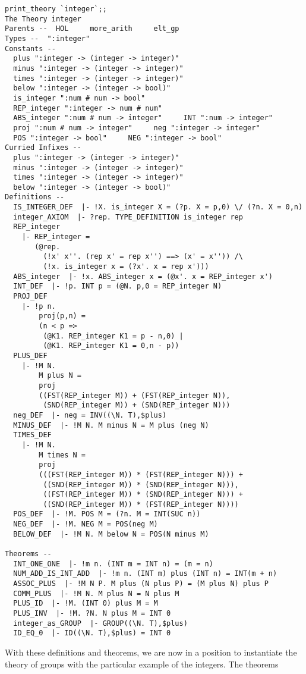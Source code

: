 \begin{verbatim}
print_theory `integer`;;
The Theory integer
Parents --  HOL     more_arith     elt_gp     
Types --  ":integer"     
Constants --
  plus ":integer -> (integer -> integer)"
  minus ":integer -> (integer -> integer)"
  times ":integer -> (integer -> integer)"
  below ":integer -> (integer -> bool)"
  is_integer ":num # num -> bool"
  REP_integer ":integer -> num # num"
  ABS_integer ":num # num -> integer"     INT ":num -> integer"
  proj ":num # num -> integer"     neg ":integer -> integer"
  POS ":integer -> bool"     NEG ":integer -> bool"     
Curried Infixes --
  plus ":integer -> (integer -> integer)"
  minus ":integer -> (integer -> integer)"
  times ":integer -> (integer -> integer)"
  below ":integer -> (integer -> bool)"     
Definitions --
  IS_INTEGER_DEF  |- !X. is_integer X = (?p. X = p,0) \/ (?n. X = 0,n)
  integer_AXIOM  |- ?rep. TYPE_DEFINITION is_integer rep
  REP_integer
    |- REP_integer =
       (@rep.
         (!x' x''. (rep x' = rep x'') ==> (x' = x'')) /\
         (!x. is_integer x = (?x'. x = rep x')))
  ABS_integer  |- !x. ABS_integer x = (@x'. x = REP_integer x')
  INT_DEF  |- !p. INT p = (@N. p,0 = REP_integer N)
  PROJ_DEF
    |- !p n.
        proj(p,n) =
        (n < p => 
         (@K1. REP_integer K1 = p - n,0) | 
         (@K1. REP_integer K1 = 0,n - p))
  PLUS_DEF
    |- !M N.
        M plus N =
        proj
        ((FST(REP_integer M)) + (FST(REP_integer N)),
         (SND(REP_integer M)) + (SND(REP_integer N)))
  neg_DEF  |- neg = INV((\N. T),$plus)
  MINUS_DEF  |- !M N. M minus N = M plus (neg N)
  TIMES_DEF
    |- !M N.
        M times N =
        proj
        (((FST(REP_integer M)) * (FST(REP_integer N))) +
         ((SND(REP_integer M)) * (SND(REP_integer N))),
         ((FST(REP_integer M)) * (SND(REP_integer N))) +
         ((SND(REP_integer M)) * (FST(REP_integer N))))
  POS_DEF  |- !M. POS M = (?n. M = INT(SUC n))
  NEG_DEF  |- !M. NEG M = POS(neg M)
  BELOW_DEF  |- !M N. M below N = POS(N minus M)

Theorems --
  INT_ONE_ONE  |- !m n. (INT m = INT n) = (m = n)
  NUM_ADD_IS_INT_ADD  |- !m n. (INT m) plus (INT n) = INT(m + n)
  ASSOC_PLUS  |- !M N P. M plus (N plus P) = (M plus N) plus P
  COMM_PLUS  |- !M N. M plus N = N plus M
  PLUS_ID  |- !M. (INT 0) plus M = M
  PLUS_INV  |- !M. ?N. N plus M = INT 0
  integer_as_GROUP  |- GROUP((\N. T),$plus)
  ID_EQ_0  |- ID((\N. T),$plus) = INT 0
\end{verbatim}
With these definitions and theorems, we are now in a position to instantiate
the theory of groups with the particular example of the integers.  The theorems
